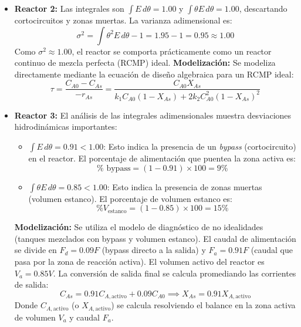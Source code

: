 \begin{enumerate}[label={\alph*)}]
\begin{itemize}
		      \item \textbf{Reactor 2:}
		            Las integrales son $\int E \, d\theta = 1.00$ y $\int \theta E \, d\theta = 1.00$, descartando cortocircuitos y zonas muertas.
		            La varianza adimensional es:
		            \begin{equation*}
			            \sigma^2 = \int \theta^2 E \, d\theta - 1 = 1.95 - 1 = 0.95 \approx 1.00
		            \end{equation*}
		            Como $\sigma^2 \approx 1.00$, el reactor se comporta prácticamente como un reactor continuo de mezcla perfecta (RCMP) ideal.
		            \textbf{Modelización:} Se modeliza directamente mediante la ecuación de diseño algebraica para un RCMP ideal:
		            \begin{equation*}
			            \tau = \frac{C_{A0} - C_{As}}{-r_{As}} = \frac{C_{A0} X_{As}}{k_1 C_{A0}(1-X_{As}) + 2 k_2 C_{A0}^2(1-X_{As})^2}
		            \end{equation*}

		      \item \textbf{Reactor 3:}
		            El análisis de las integrales adimensionales muestra desviaciones hidrodinámicas importantes:
		            \begin{itemize}
			            \item $\int E \, d\theta = 0.91 < 1.00$: Esto indica la presencia de un \textit{bypass} (cortocircuito) en el reactor. El porcentaje de alimentación que puentea la zona activa es:
			                  \begin{equation*}
				                  \% \text{ bypass} = (1 - 0.91) \times 100 = 9\%
			                  \end{equation*}
			            \item $\int \theta E \, d\theta = 0.85 < 1.00$: Esto indica la presencia de zonas muertas (volumen estanco). El porcentaje de volumen estanco es:
			                  \begin{equation*}
				                  \% V_{\text{estanco}} = (1 - 0.85) \times 100 = 15\%
			                  \end{equation*}
		            \end{itemize}
		            \textbf{Modelización:} Se utiliza el modelo de diagnóstico de no idealidades (tanques mezclados con bypass y volumen estanco). El caudal de alimentación se divide en $F_d = 0.09 F$ (bypass directo a la salida) y $F_a = 0.91 F$ (caudal que pasa por la zona de reacción activa). El volumen activo del reactor es $V_a = 0.85 V$.
		            La conversión de salida final se calcula promediando las corrientes de salida:
		            \begin{equation*}
			            C_{As} = 0.91 C_{A,\text{activo}} + 0.09 C_{A0} \implies X_{As} = 0.91 X_{A,\text{activo}}
		            \end{equation*}
		            Donde $C_{A,\text{activo}}$ (o $X_{A,\text{activo}}$) se calcula resolviendo el balance en la zona activa de volumen $V_a$ y caudal $F_a$.
	      \end{itemize}


\end{enumerate}
